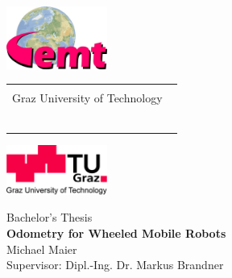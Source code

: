 
\begin{titlepage}

  \begin{center}
    \begin{minipage}[htb]{18cm}
      \hspace*{-2.6cm}
      \includegraphics[width=3.3cm]{./figures/logos/EMT.jpg}
      \begin{tabular}{p{10cm}}\centering{
      \Large Institute of Electrical Measurement and Measurement Signal Processing\\ Graz University of Technology
      ~\\
      ~\\}
      \end{tabular}
      \includegraphics[width=3.3cm]{./figures/logos/TUG.jpg}
    \end{minipage}

    \Large {Bachelor's Thesis\\} %
    \vspace*{1cm} \huge{\textbf{Odometry for Wheeled Mobile Robots}\\}
    \vspace*{1.0cm} 
    \Large{Michael Maier\\} \vspace*{1cm}
    \Large{Supervisor: Dipl.-Ing. Dr. Markus Brandner\\} \vspace*{2.5cm}%



\end{center}
\end{titlepage}
